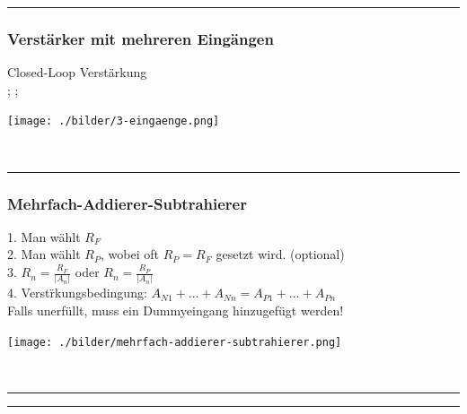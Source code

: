   \hrule
	\subsubsection{Verstärker mit mehreren Eingängen}
		\begin{minipage}[T]{13cm}
      Closed-Loop Verst\"arkung
      \hspace{3mm}\\
      \hspace*{43mm}
      ;\hspace{0.3mm}
      ;\hspace{0.3mm}\\
    \end{minipage}
		\begin{minipage}{6cm}
      \texttt{[image: ./bilder/3-eingaenge.png]}
    \end{minipage}\\
\hrule

	\subsubsection{Mehrfach-Addierer-Subtrahierer} 		
    \begin{minipage}[T]{13cm}
      1. Man w\"ahlt $R_{F}$\\
      2. Man w\"ahlt $R_{P}$, wobei oft $R_{P}=R_{F}$ gesetzt wird. (optional)\\
      3. $R_{n}=\frac{R_{F}}{\left|A_{n}\right|}$ oder
      $R_{n}=\frac{R_{P}}{\left|A_{n}\right|}$\\ 
      4. Verst\"rkungsbedingung: $A_{N1} +
      \ldots + A_{Nn} = A_{P1} + \ldots + A_{Pn}$ \\Falls unerf\"ullt, muss ein Dummyeingang hinzugefügt werden!
    \end{minipage}
    \begin{minipage}{6cm}
      \texttt{[image: ./bilder/mehrfach-addierer-subtrahierer.png]} 
    \end{minipage}\\
    
 \hrule
  

  \hrule        
